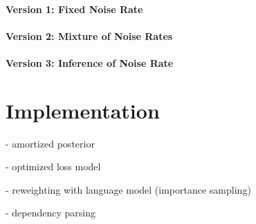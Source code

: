 \documentclass[11pt,a4paper]{article}
\begin{document}
\paragraph{Version 1: Fixed Noise Rate}

\paragraph{Version 2: Mixture of Noise Rates}

\paragraph{Version 3: Inference of Noise Rate}

\section{Implementation}

- amortized posterior

- optimized loss model

- reweighting with language model (importance sampling)

- dependency parsing
\end{document}
